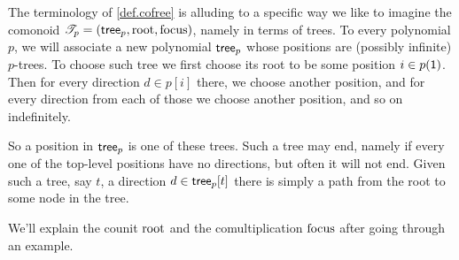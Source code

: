 \documentclass[Book-Poly]{subfiles}
\begin{document}
The terminology of \cref{def.cofree} is alluding to a specific way we like to imagine the comonoid $\mathscr{T}_{p}=(\mathsf{tree}_p,\mathrm{root},\mathrm{focus})$, namely in terms of trees. To every polynomial $p$, we will associate a new polynomial $\mathsf{tree}_p$ whose positions are (possibly infinite) $p$-trees. To choose such tree we first choose its root to be some position $i\in p(\textsf{1})$. Then for every direction $d\in p[i]$ there, we choose another position, and for every direction from each of those we choose another position, and so on indefinitely.

So a position in $\mathsf{tree}_p$ is one of these trees. Such a tree may end, namely if every one of the top-level positions have no directions, but often it will not end. Given such a tree, say $t$, a direction $d\in\mathsf{tree}_p[t]$ there is simply a path from the root to some node in the tree. 

We'll explain the counit $\mathrm{root}$ and the comultiplication $\mathrm{focus}$ after going through an example.
\end{document}

